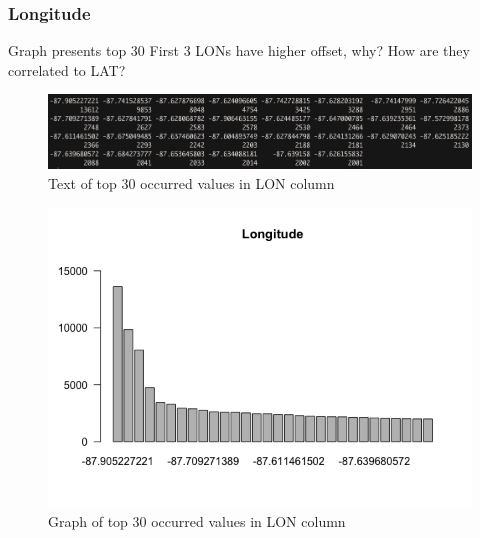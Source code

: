 \newpage
\subsubsection{Longitude}
Graph presents top 30
First 3 LONs have higher offset, why? How are they correlated to LAT?
\begin{figure}[H]
\includegraphics[scale=0.4]{images/EDA/LON.jpg}
\centering
\caption{Text of top 30 occurred values in LON column}
\end{figure}
\begin{figure}[H]
\includegraphics[scale=0.7]{images/EDA/LON.png}
\centering
\caption{Graph of top 30 occurred values in LON column}
\end{figure}
